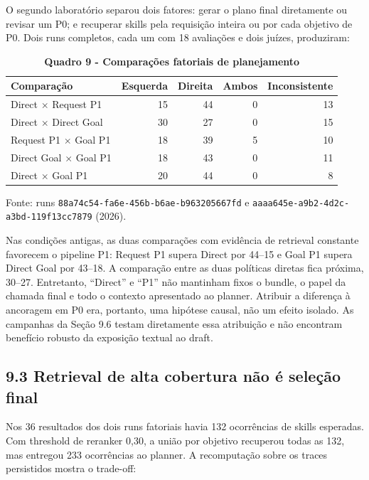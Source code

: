 \documentclass[12pt,a4paper]{article}
\begin{document}
O segundo laboratório separou dois fatores: gerar o plano final diretamente ou revisar um P0; e recuperar skills pela requisição inteira ou por cada objetivo de P0. Dois runs completos, cada um com 18 avaliações e dois juízes, produziram:

\begin{table}[H]
\centering
\caption*{\textbf{Quadro 9 - Comparações fatoriais de planejamento}}
\footnotesize
\renewcommand{\arraystretch}{1.12}
\begin{tabularx}{\linewidth}{|Y|r|r|r|r|}
\hline
\textbf{Comparação} & \textbf{Esquerda} & \textbf{Direita} & \textbf{Ambos} & \textbf{Inconsistente} \\
\hline
Direct \(\times\) Request P1 & 15 & 44 & 0 & 13 \\
\hline
Direct \(\times\) Direct Goal & 30 & 27 & 0 & 15 \\
\hline
Request P1 \(\times\) Goal P1 & 18 & 39 & 5 & 10 \\
\hline
Direct Goal \(\times\) Goal P1 & 18 & 43 & 0 & 11 \\
\hline
Direct \(\times\) Goal P1 & 20 & 44 & 0 & 8 \\
\hline
\end{tabularx}
\par\smallskip\raggedright\small Fonte: runs \texttt{88a74c54-fa6e-456b-b6ae-b963205667fd} e \texttt{aaaa645e-a9b2-4d2c-a3bd-119f13cc7879} (2026).
\end{table}

Nas condições antigas, as duas comparações com evidência de retrieval constante favorecem o pipeline P1: Request P1 supera Direct por 44--15 e Goal P1 supera Direct Goal por 43--18. A comparação entre as duas políticas diretas fica próxima, 30--27. Entretanto, ``Direct'' e ``P1'' não mantinham fixos o bundle, o papel da chamada final e todo o contexto apresentado ao planner. Atribuir a diferença à ancoragem em P0 era, portanto, uma hipótese causal, não um efeito isolado. As campanhas da Seção 9.6 testam diretamente essa atribuição e não encontram benefício robusto da exposição textual ao draft.

\subsection*{9.3 Retrieval de alta cobertura não é seleção final}

Nos 36 resultados dos dois runs fatoriais havia 132 ocorrências de skills esperadas. Com threshold de reranker 0,30, a união por objetivo recuperou todas as 132, mas entregou 233 ocorrências ao planner. A recomputação sobre os traces persistidos mostra o trade-off:
\end{document}
